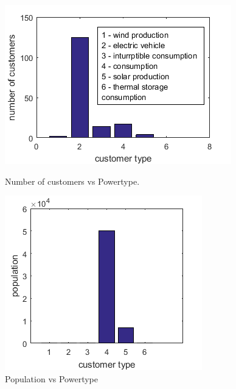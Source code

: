 \begin{itemize}
\begin{figure}
\centering
\begin{minipage}{.5\textwidth}
  \centering
  \includegraphics[width=\linewidth]{4-customer-vs-powertype.png}
  \caption{Number of customers vs Powertype.}
  \label{fig:cust-pt}
\end{minipage}%
\begin{minipage}{.5\textwidth}
  \centering
  \includegraphics[width=\linewidth]{2-population-vs-powertype.jpg}
  \caption{Population vs Powertype}
  \label{fig:pop-pt}
\end{minipage}


\end{figure}
\end{itemize}
